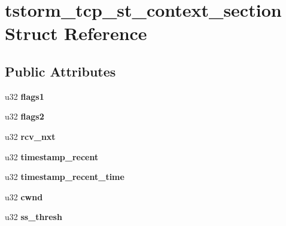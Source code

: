 \hypertarget{structtstorm__tcp__st__context__section}{
\section{tstorm\_\-tcp\_\-st\_\-context\_\-section Struct Reference}
\label{structtstorm__tcp__st__context__section}
}
\subsection*{Public Attributes}
\begin{DoxyCompactItemize}
\item 
\hypertarget{structtstorm__tcp__st__context__section_a3195f63fea99641f3d3a78fb0280ce80}{
u32 {\bfseries flags1}}
\label{structtstorm__tcp__st__context__section_a3195f63fea99641f3d3a78fb0280ce80}

\item 
\hypertarget{structtstorm__tcp__st__context__section_abc6b7299ddd85a46e34ae6630ff83a0e}{
u32 {\bfseries flags2}}
\label{structtstorm__tcp__st__context__section_abc6b7299ddd85a46e34ae6630ff83a0e}

\item 
\hypertarget{structtstorm__tcp__st__context__section_a36d583fc1af9e1eb37cbea4e605e9363}{
u32 {\bfseries rcv\_\-nxt}}
\label{structtstorm__tcp__st__context__section_a36d583fc1af9e1eb37cbea4e605e9363}

\item 
\hypertarget{structtstorm__tcp__st__context__section_a2f7781c14defd1d971822e22e1717d50}{
u32 {\bfseries timestamp\_\-recent}}
\label{structtstorm__tcp__st__context__section_a2f7781c14defd1d971822e22e1717d50}

\item 
\hypertarget{structtstorm__tcp__st__context__section_a81d62b672d55b18220426ad06f314c23}{
u32 {\bfseries timestamp\_\-recent\_\-time}}
\label{structtstorm__tcp__st__context__section_a81d62b672d55b18220426ad06f314c23}

\item 
\hypertarget{structtstorm__tcp__st__context__section_ad37d0d54b896384f2b98953166082114}{
u32 {\bfseries cwnd}}
\label{structtstorm__tcp__st__context__section_ad37d0d54b896384f2b98953166082114}

\item 
\hypertarget{structtstorm__tcp__st__context__section_a486fd8780abbce870cb4c3f01fba4075}{
u32 {\bfseries ss\_\-thresh}}
\label{structtstorm__tcp__st__context__section_a486fd8780abbce870cb4c3f01fba4075}


\end{DoxyCompactItemize}
